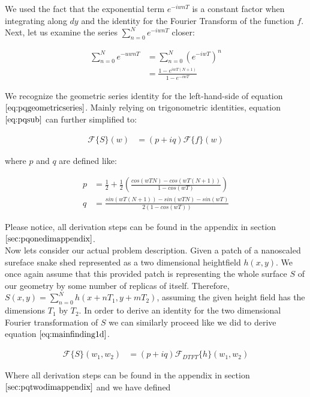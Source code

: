 We used the fact that the exponential term $e^{-iwnT}$ is a constant factor when integrating along $dy$ and the identity for the Fourier Transform of the function $f$. Next, let us examine the series $\sum_{n=0}^N e^{-iwnT}$ closer:

\begin{align}
\sum_{n=0}^N e^{-uwnT}
& =\sum_{n=0}^N (e^{-iwT})^n \nonumber \\
& =\frac{1-e^{iwT(N+1)}}{1-e^{-iwT}}
\label{eq:pqgeometricseries}
\end{align}

We recognize the geometric series identity for the left-hand-side of equation $\ref{eq:pqgeometricseries}$. Mainly relying on trigonometric identities, equation $\ref{eq:pqsub}$ can further simplified to:  

\begin{align}
\mathcal{F}\{S\}(w)
& = (p+iq) \mathcal{F}\{f\}(w)  
\label{eq:mainfinding1d}
\end{align}

where $p$ and $q$ are defined like:

\begin{align}
p& =\frac{1}{2}+\frac{1}{2}\left(\frac{cos(wTN)-cos(wT(N+1))}{1-cos(wT)}\right) \nonumber \\
q& =\frac{sin(wT(N+1))-sin(wTN)-sin(wT)}{2(1-cos(wT))}
\end{align}

Please notice, all derivation steps can be found in the appendix in section $\ref{sec:pqonedimappendix}$. \\

Now lets consider our actual problem description. Given a patch of a nanoscaled sureface snake shed represented as a two dimensional heightfield $h(x,y)$. We once again assume that this provided patch is representing the whole surface $S$ of our geometry by some number of replicas of itself. Therefore, $S(x,y) = \sum_{n=0}^{N} h(x+nT_1, y+mT_2)$, assuming the given height field has the dimensions $T_1$ by $T_2$. In order to derive an identity for the two dimensional Fourier transformation of $S$ we can similarly proceed like we did to derive equation $\ref{eq:mainfinding1d}$.

\begin{align}
\mathcal{F}\{S\}(w_1, w_2)
& =(p + iq) \mathcal{F}_{DTFT}\{h\}(w_1,w_2)
\label{eq:pqmainfinding}
\end{align}

Where all derivation steps can be found in the appendix in section $\ref{sec:pqtwodimappendix}$ and we have defined 

